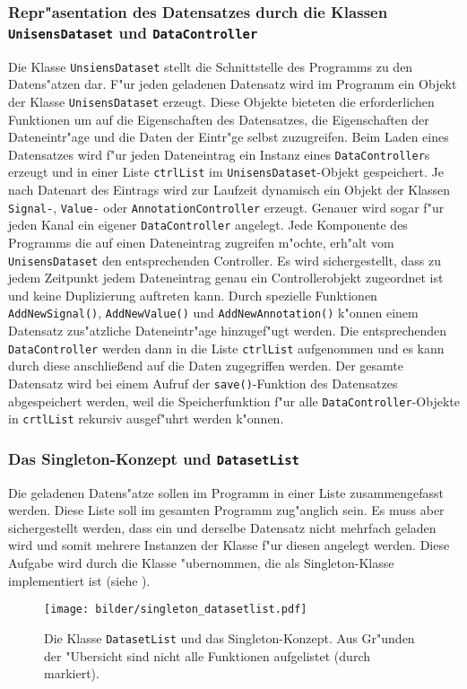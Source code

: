 \subsubsection{Repr"asentation des Datensatzes durch die Klassen \texttt{UnisensDataset} und \texttt{DataController}}

Die Klasse \verb|UnsiensDataset| stellt die Schnittstelle des Programms zu den Datens"atzen dar.
F"ur jeden geladenen Datensatz wird im Programm ein Objekt der Klasse \verb|UnisensDataset| erzeugt.
Diese Objekte bieteten die erforderlichen Funktionen um auf die Eigenschaften des Datensatzes, die Eigenschaften der Dateneintr"age und die Daten der Eintr"ge selbst zuzugreifen.
Beim Laden eines Datensatzes wird f"ur jeden Dateneintrag ein Instanz eines \verb|DataController|s erzeugt und in einer Liste \verb|ctrlList| im \verb|UnisensDataset|-Objekt gespeichert.
Je nach Datenart des Eintrags wird zur Laufzeit dynamisch ein Objekt der Klassen \verb|Signal-|, \verb|Value-| oder \verb|AnnotationController| erzeugt.
Genauer wird sogar f"ur jeden Kanal ein eigener \verb|DataController| angelegt.
Jede Komponente des Programms die auf einen Dateneintrag zugreifen m"ochte, erh"alt vom \verb|UnisensDataset| den entsprechenden Controller.
Es wird sichergestellt, dass zu jedem Zeitpunkt jedem Dateneintrag genau ein Controllerobjekt zugeordnet ist und keine Duplizierung auftreten kann.
Durch spezielle Funktionen \verb|AddNewSignal()|, \verb|AddNewValue()| und \verb|AddNewAnnotation()| k"onnen einem Datensatz zus"atzliche Dateneintr"age hinzugef"ugt werden.
Die entsprechenden \verb|DataController| werden dann in die Liste \verb|ctrlList| aufgenommen und es kann durch diese anschlie\ss end auf die Daten zugegriffen werden.
Der gesamte Datensatz wird bei einem Aufruf der \verb|save()|-Funktion des Datensatzes abgespeichert werden, weil die Speicherfunktion f"ur alle \verb|DataController|-Objekte in \verb|crtlList| rekursiv ausgef"uhrt werden k"onnen.

\subsubsection{Das Singleton-Konzept und \texttt{DatasetList}}

Die geladenen Datens"atze sollen im Programm in einer Liste zusammengefasst werden.
Diese Liste soll im gesamten Programm zug"anglich sein.
Es muss aber sichergestellt werden, dass ein und derselbe Datensatz nicht mehrfach geladen wird und somit mehrere Instanzen der Klasse  f"ur diesen angelegt werden.
Diese Aufgabe wird durch die Klasse  "ubernommen, die als Singleton-Klasse implementiert ist (siehe ).
\begin{figure}[htb]
\centering
\texttt{[image: bilder/singleton\_datasetlist.pdf]}
\caption[Klasse \texttt{DatasetList} und das Singleton-Konzept]{Die Klasse \texttt{DatasetList} und das Singleton-Konzept. Aus Gr"unden der "Ubersicht sind nicht alle Funktionen aufgelistet (durch  markiert).}
\label{pic:datasetlist}
\end{figure}

